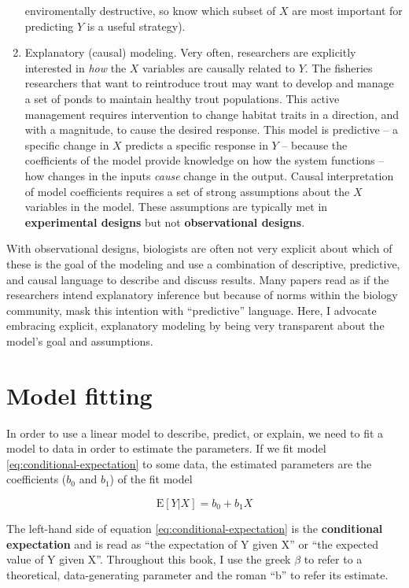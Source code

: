 \documentclass[]{book}
\theoremstyle{definition}
\theoremstyle{definition}
\theoremstyle{definition}
\theoremstyle{remark}
\begin{document}
\begin{enumerate}
  enviromentally destructive, so know which subset of \(X\) are most
  important for predicting \(Y\) is a useful strategy).
\item
  Explanatory (causal) modeling. Very often, researchers are explicitly
  interested in \emph{how} the \(X\) variables are causally related to
  \(Y\). The fisheries researchers that want to reintroduce trout may
  want to develop and manage a set of ponds to maintain healthy trout
  populations. This active management requires intervention to change
  habitat traits in a direction, and with a magnitude, to cause the
  desired response. This model is predictive -- a specific change in
  \(X\) predicts a specific response in \(Y\) -- because the
  coefficients of the model provide knowledge on how the system
  functions -- how changes in the inputs \emph{cause} change in the
  output. Causal interpretation of model coefficients requires a set of
  strong assumptions about the \(X\) variables in the model. These
  assumptions are typically met in \textbf{experimental designs} but not
  \textbf{observational designs}.
\end{enumerate}

With observational designs, biologists are often not very explicit about
which of these is the goal of the modeling and use a combination of
descriptive, predictive, and causal language to describe and discuss
results. Many papers read as if the researchers intend explanatory
inference but because of norms within the biology community, mask this
intention with ``predictive'' language. Here, I advocate embracing
explicit, explanatory modeling by being very transparent about the
model's goal and assumptions.

\section{Model fitting}\label{model-fitting}

In order to use a linear model to describe, predict, or explain, we need
to fit a model to data in order to estimate the parameters. If we fit
model \eqref{eq:conditional-expectation} to some data, the estimated
parameters are the coefficients (\(b_0\) and \(b_1\)) of the fit model

\begin{equation}
\mathrm{E}[Y|X] = b_0 + b_1 X
\label{eq:conditional-expectation}
\end{equation}

The left-hand side of equation \eqref{eq:conditional-expectation} is the
\textbf{conditional expectation} and is read as ``the expectation of Y
given X'' or ``the expected value of Y given X''. Throughout this book,
I use the greek \(\beta\) to refer to a theoretical, data-generating
parameter and the roman ``b'' to refer its estimate.
\end{document}

